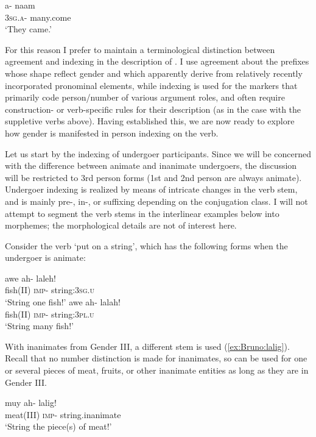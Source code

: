\documentclass[output=collectionpaper]{langsci/langscibook}
\begin{document}
\ea
\label{ex:Bruno:naxam}
\gll a- na\GH am\\
3\textsc{sg}.\textsc{a}- many.come\\
\glt `They came.'
\z

For this reason I prefer to maintain a terminological distinction between agreement and indexing in the description of . I use agreement about the prefixes whose shape reflect gender and which apparently derive from relatively recently incorporated pronominal elements, while indexing is used for the markers that primarily code person/number of various argument roles, and often require construction- or verb-specific rules for their description (as in the case with the suppletive verbs above). Having established this, we are now ready to explore how gender is manifested in person indexing on the verb.

Let us start by the indexing of undergoer participants. Since we will be concerned with the difference between animate and inanimate undergoers, the discussion will be restricted to 3rd person forms (1st and 2nd person are always animate). Undergoer indexing is realized by means of intricate changes in the verb stem, and is mainly pre-, in-, or suffixing depending on the conjugation class. I will not attempt to segment the verb stems in the interlinear examples below into morphemes; the morphological details are not of interest here.

Consider the verb `put on a string', which has the following forms when the undergoer is animate:

\ea\label{ex:Bruno:}
\begin{xlist}
\ex
\gll awe ah- laleh!\\
fish(II) \textsc{imp}- string:3\textsc{sg}.\textsc{u}\\
\glt `String one fish!'
\ex
\gll awe ah- lalah!\\
fish(II) \textsc{imp}- string:3\textsc{pl}.\textsc{u}\\
\glt `String many fish!'
\end{xlist}
\z

\noindent With inanimates from Gender III, a different stem  is used (\ref{ex:Bruno:lalig}). Recall that no number distinction is made for inanimates, so  can be used for one or several pieces of meat, fruits, or other inanimate entities as long as they are in Gender III.

\ea\label{ex:Bruno:lalig}
\gll muy ah- lalig!\\
meat(III) \textsc{imp}- string.inanimate\\
\glt `String the piece(s) of meat!'
\z
\end{document}
